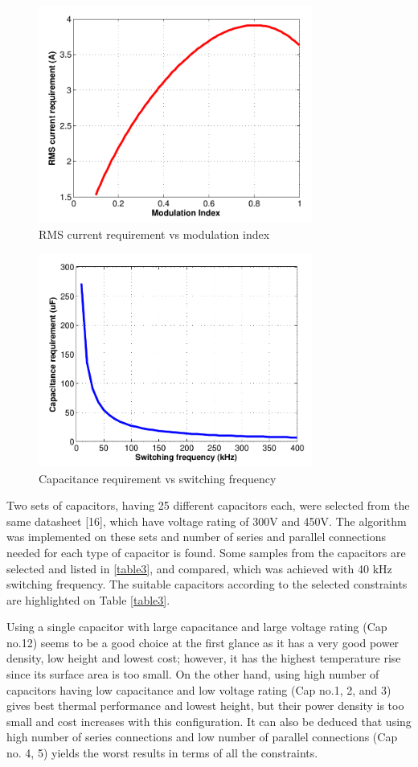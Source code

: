 \documentclass[conference,a4paper,twocolumn]{IEEEtran}
\begin{document}
\begin{figure}[h]
  \centering
  \includegraphics[width=9cm]{fig7_2}
  \caption{RMS current requirement vs modulation index}
  \label{fig7}
\end{figure}


\begin{figure}[h]
  \centering
  \includegraphics[width=9cm]{fig8_2}
  \caption{Capacitance requirement vs switching frequency}
  \label{fig8}
\end{figure}

Two sets of capacitors, having 25 different capacitors each, were selected from the same datasheet [16], which have voltage rating of 300V and 450V. The algorithm was implemented on these sets and number of series and parallel connections needed for each type of capacitor is found. Some samples from the capacitors are selected and listed in \ref{table3}, and compared, which was achieved with 40 kHz switching frequency. The suitable capacitors according to the selected constraints are highlighted on Table \ref{table3}.

Using a single capacitor with large capacitance and large voltage rating (Cap no.12) seems to be a good choice at the first glance as it has a very good power density, low height and lowest cost; however, it has the highest temperature rise since its surface area is too small. On the other hand, using high number of capacitors having low capacitance and low voltage rating (Cap no.1, 2, and 3) gives best thermal performance and lowest height, but their power density is too small and cost increases with this configuration. It can also be deduced that using high number of series connections and low number of parallel connections (Cap no. 4, 5) yields the worst results in terms of all the constraints.
\end{document}
